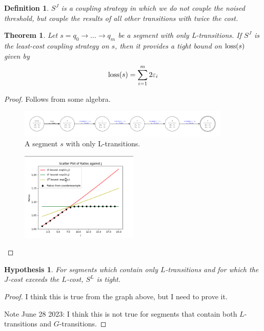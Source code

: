 \documentclass{article}
\newtheorem{theorem}{Theorem}
\newtheorem{hypothesis}{Hypothesis}[section]
\newtheorem{definition}{Definition}[section]
\renewcommand{\epsilon}{\varepsilon}
\newcommand{\loss}{\textup{loss}}
\newcommand{\1}{\langle 1 \rangle}
\newcommand{\2}{\langle 2 \rangle}
\begin{document}
\begin{definition}
    $S^J$ is a coupling strategy in which we do not couple the noised threshold, but couple the results of all other transitions with twice the cost. 
\end{definition}

\begin{theorem}
    Let $s = q_0 \to \dots \to q_m$ be a segment with only L-transitions. If $S^J$ is the least-cost coupling strategy on $s$, then it provides a tight bound on $\loss(s)$ given by \[\loss(s) = \sum_{i = 1}^{m} 2\epsilon_i\]
\end{theorem}

\begin{proof}
    Follows from some algebra.

    \begin{figure}[H]
        \centering
        \includegraphics[width=0.9\textwidth]{figures/only_l_transitions.png}
        \caption{A segment $s$ with only L-transitions.}
        \label{fig:segment_j}
    \end{figure}

    \begin{figure}[H]
        \centering
        \includegraphics[width=0.5\textwidth]{figures/only_l_transitions_plot.png}
        \caption{}
        \label{fig:segment_j_coupling}
    \end{figure}
\end{proof}

\begin{hypothesis}
    For segments which contain only $L$-transitions and for which the $J$-cost exceeds the $L$-cost, $S^L$ is tight.
\end{hypothesis}

\begin{proof}
    I think this is true from the graph above, but I need to prove it.

    Note June 28 2023: I think this is not true for segments that contain both $L$-transitions and $G$-transitions.
\end{proof}
\end{document}
